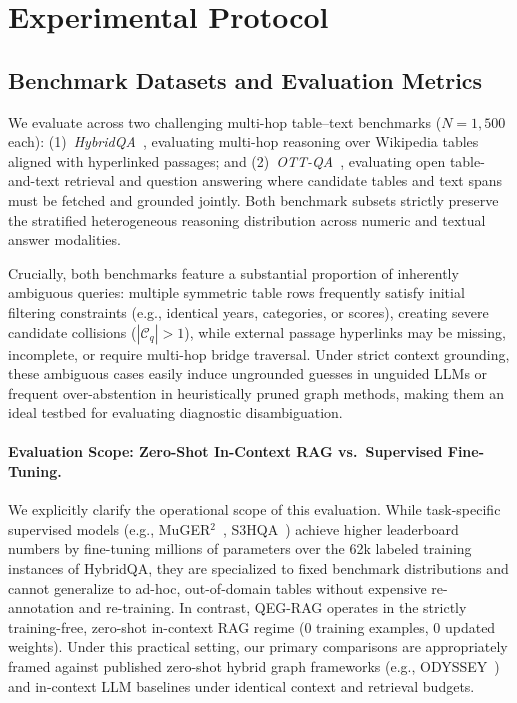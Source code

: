 \documentclass[runningheads]{llncs}
\begin{document}
\section{Experimental Protocol}
\label{sec:experiments}

\subsection{Benchmark Datasets and Evaluation Metrics}
We evaluate across two challenging multi-hop table--text benchmarks ($N=1{,}500$ each): (1)~\emph{HybridQA}~\cite{hybridqa}, evaluating multi-hop reasoning over Wikipedia tables aligned with hyperlinked passages; and (2)~\emph{OTT-QA}~\cite{chen2021ottqa}, evaluating open table-and-text retrieval and question answering where candidate tables and text spans must be fetched and grounded jointly. Both benchmark subsets strictly preserve the stratified heterogeneous reasoning distribution across numeric and textual answer modalities.

Crucially, both benchmarks feature a substantial proportion of inherently ambiguous queries: multiple symmetric table rows frequently satisfy initial filtering constraints (e.g., identical years, categories, or scores), creating severe candidate collisions ($|\mathcal{C}_q| > 1$), while external passage hyperlinks may be missing, incomplete, or require multi-hop bridge traversal. Under strict context grounding, these ambiguous cases easily induce ungrounded guesses in unguided LLMs or frequent over-abstention in heuristically pruned graph methods, making them an ideal testbed for evaluating diagnostic disambiguation.

\paragraph{Evaluation Scope: Zero-Shot In-Context RAG vs.\ Supervised Fine-Tuning.}
We explicitly clarify the operational scope of this evaluation. While task-specific supervised models (e.g., MuGER$^2$~\cite{chen2022muger2}, S3HQA~\cite{lei2023s3hqa}) achieve higher leaderboard numbers by fine-tuning millions of parameters over the 62k labeled training instances of HybridQA, they are specialized to fixed benchmark distributions and cannot generalize to ad-hoc, out-of-domain tables without expensive re-annotation and re-training. In contrast, QEG-RAG operates in the strictly training-free, zero-shot in-context RAG regime (0 training examples, 0 updated weights). Under this practical setting, our primary comparisons are appropriately framed against published zero-shot hybrid graph frameworks (e.g., ODYSSEY~\cite{agarwal2025hybrid}) and in-context LLM baselines under identical context and retrieval budgets.
\end{document}
